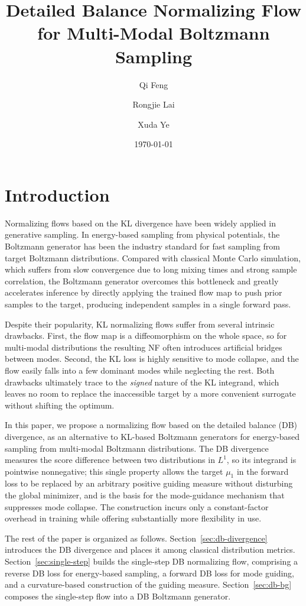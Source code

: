 \documentclass{article}
\title{Detailed Balance Normalizing Flow for Multi-Modal Boltzmann Sampling}
\author[1]{Qi Feng}
\author[2]{Rongjie Lai}
\author[2]{Xuda Ye}
\affil[1]{Department of Mathematics, Florida State University, Tallahassee, FL 32306}
\affil[2]{Department of Mathematics, Purdue University, West Lafayette, IN 47907}
\date{\today}
\theoremstyle{plain}
\begin{document}
\maketitle

\section{Introduction}

Normalizing flows based on the KL divergence \citep{rezende2015variational} have been widely applied in generative sampling. In energy-based sampling from physical potentials, the Boltzmann generator \citep{noe2019boltzmann,wu2020stochastic} has been the industry standard for fast sampling from target Boltzmann distributions. Compared with classical Monte Carlo simulation, which suffers from slow convergence due to long mixing times and strong sample correlation, the Boltzmann generator overcomes this bottleneck and greatly accelerates inference by directly applying the trained flow map to push prior samples to the target, producing independent samples in a single forward pass.

Despite their popularity, KL normalizing flows suffer from several intrinsic drawbacks. First, the flow map is a diffeomorphism on the whole space, so for multi-modal distributions the resulting NF often introduces artificial bridges between modes. Second, the KL loss is highly sensitive to mode collapse, and the flow easily falls into a few dominant modes while neglecting the rest. Both drawbacks ultimately trace to the \emph{signed} nature of the KL integrand, which leaves no room to replace the inaccessible target by a more convenient surrogate without shifting the optimum.

In this paper, we propose a normalizing flow based on the detailed balance (DB) divergence, as an alternative to KL-based Boltzmann generators for energy-based sampling from multi-modal Boltzmann distributions. The DB divergence measures the score difference between two distributions in $L^1$, so its integrand is pointwise nonnegative; this single property allows the target $\mu_1$ in the forward loss to be replaced by an arbitrary positive guiding measure without disturbing the global minimizer, and is the basis for the mode-guidance mechanism that suppresses mode collapse. The construction incurs only a constant-factor overhead in training while offering substantially more flexibility in use.

The rest of the paper is organized as follows. Section~\ref{sec:db-divergence} introduces the DB divergence and places it among classical distribution metrics. Section~\ref{sec:single-step} builds the single-step DB normalizing flow, comprising a reverse DB loss for energy-based sampling, a forward DB loss for mode guiding, and a curvature-based construction of the guiding measure. Section~\ref{sec:db-bg} composes the single-step flow into a DB Boltzmann generator.
\end{document}
